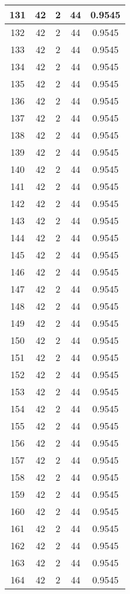 \documentclass[letterpaper, 12pt]{article}
\begin{document}
\begin{longtable}{|c|c|c|c|c|}
\hline
131 & 42 & 2 & 44 & 0.9545 \\
\hline
132 & 42 & 2 & 44 & 0.9545 \\
\hline
133 & 42 & 2 & 44 & 0.9545 \\
\hline
134 & 42 & 2 & 44 & 0.9545 \\
\hline
135 & 42 & 2 & 44 & 0.9545 \\
\hline
136 & 42 & 2 & 44 & 0.9545 \\
\hline
137 & 42 & 2 & 44 & 0.9545 \\
\hline
138 & 42 & 2 & 44 & 0.9545 \\
\hline
139 & 42 & 2 & 44 & 0.9545 \\
\hline
140 & 42 & 2 & 44 & 0.9545 \\
\hline
141 & 42 & 2 & 44 & 0.9545 \\
\hline
142 & 42 & 2 & 44 & 0.9545 \\
\hline
143 & 42 & 2 & 44 & 0.9545 \\
\hline
144 & 42 & 2 & 44 & 0.9545 \\
\hline
145 & 42 & 2 & 44 & 0.9545 \\
\hline
146 & 42 & 2 & 44 & 0.9545 \\
\hline
147 & 42 & 2 & 44 & 0.9545 \\
\hline
148 & 42 & 2 & 44 & 0.9545 \\
\hline
149 & 42 & 2 & 44 & 0.9545 \\
\hline
150 & 42 & 2 & 44 & 0.9545 \\
\hline
151 & 42 & 2 & 44 & 0.9545 \\
\hline
152 & 42 & 2 & 44 & 0.9545 \\
\hline
153 & 42 & 2 & 44 & 0.9545 \\
\hline
154 & 42 & 2 & 44 & 0.9545 \\
\hline
155 & 42 & 2 & 44 & 0.9545 \\
\hline
156 & 42 & 2 & 44 & 0.9545 \\
\hline
157 & 42 & 2 & 44 & 0.9545 \\
\hline
158 & 42 & 2 & 44 & 0.9545 \\
\hline
159 & 42 & 2 & 44 & 0.9545 \\
\hline
160 & 42 & 2 & 44 & 0.9545 \\
\hline
161 & 42 & 2 & 44 & 0.9545 \\
\hline
162 & 42 & 2 & 44 & 0.9545 \\
\hline
163 & 42 & 2 & 44 & 0.9545 \\
\hline
164 & 42 & 2 & 44 & 0.9545 \\

\end{longtable}
\end{document}
